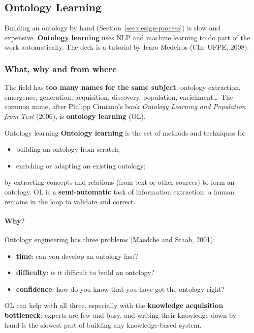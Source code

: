 \subsection{Ontology Learning}
\label{sec:ontology-learning}

Building an ontology by hand (Section~\ref{sec:design-process}) is slow and expensive.
\textbf{Ontology learning} uses NLP and machine learning to do part of the work
automatically. The deck is a tutorial by Ícaro Medeiros (CIn--UFPE, 2008).

\subsubsection{What, why and from where}

The field has \textbf{too many names for the same subject}: ontology extraction,
emergence, generation, acquisition, discovery, population, enrichment\ldots\ The common
name, after Philipp Cimiano's book \emph{Ontology Learning and Population from Text}
(2006), is \textbf{ontology learning} (OL).

\begin{nbdef}{Ontology learning}
\textbf{Ontology learning} is the set of methods and techniques for
\begin{itemize}[nosep]
  \item building an ontology from scratch;
  \item enriching or adapting an existing ontology;
\end{itemize}
by extracting concepts and relations (from text or other sources) to form an ontology.
OL is a \textbf{semi-automatic} task of information extraction: a human remains in the
loop to validate and correct.
\end{nbdef}

\paragraph{Why?}
Ontology engineering has three problems (Maedche and Staab, 2001):
\begin{itemize}[nosep]
  \item \textbf{time}: can you develop an ontology fast?
  \item \textbf{difficulty}: is it difficult to build an ontology?
  \item \textbf{confidence}: how do you know that you have got the ontology right?
\end{itemize}
OL can help with all three, especially with the \textbf{knowledge acquisition
bottleneck}: experts are few and busy, and writing their knowledge down by hand is the
slowest part of building any knowledge-based system.


